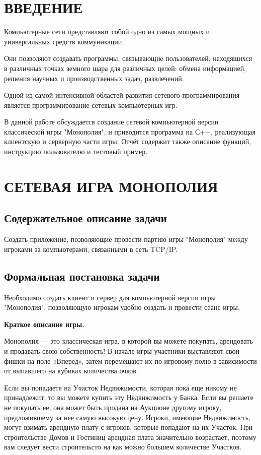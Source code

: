 

\setcounter{page}{2}
\normalfont
\tableofcontents
\clearpage
\section*{ВВЕДЕНИЕ}
Компьютерные сети представляют собой одно из самых мощных и универсальных средств коммуникации.

Они позволяют создавать программы, связывающие пользователей, находящихся в различных точках земного шара для различных целей: обмена информацией, решения научных и производственных задач, развлечений.

Одной из самой интенсивной областей развития сетевого программирования является программирование сетевых компьютерных игр.

В данной работе обсуждается создание сетевой компьютерной версии классической игры "Монополия", и приводится программа на С++, реализующая клиентскую и серверную части игры. Отчёт содержит также описание функций, инструкцию пользователю и тестовый пример.
\clearpage
\section{СЕТЕВАЯ ИГРА МОНОПОЛИЯ}
\subsection{Содержательное описание задачи}
Создать приложение, позволяющие провести партию игры "Монополия" между игроками за компьютерами, связанными в сеть TCP/IP.
\subsection{Формальная постановка задачи}
Необходимо создать клиент и сервер для компьютерной версии игры "Монополия", позволяющую игрокам удобно создать и провести сеанс игры.

{\bf Краткое описание игры.}

Монополия — это классическая игра, в которой вы можете покупать, арендовать и продавать свою собственность! В начале игры участники выставляют свои фишки на поле «Вперед», затем перемещают их по игровому полю в зависимости от выпавшего на кубиках количества очков.

Если вы попадаете на Участок Недвижимости, которая пока еще никому не принадлежит, то вы можете купить эту Недвижимость у Банка. Если вы решаете не покупать ее, она может быть продана на Аукционе другому игроку, предложившему за нее самую высокую цену. Игроки, имеющие Недвижимость, могут взимать арендную плату с игроков, которые попадают на их Участок. При строительстве Домов и Гостиниц арендная плата значительно возрастает, поэтому вам следует вести строительсто на как можно большем количестве Участков.

